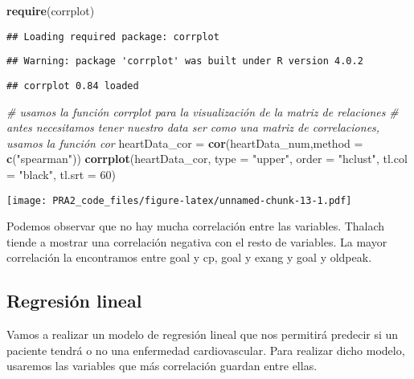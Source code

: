 \documentclass[
]{article}
\newenvironment{Shaded}{\begin{snugshade}}{\end{snugshade}}
\newcommand{\CommentTok}[1]{\textcolor[rgb]{0.56,0.35,0.01}{\textit{#1}}}
\newcommand{\DataTypeTok}[1]{\textcolor[rgb]{0.13,0.29,0.53}{#1}}
\newcommand{\DecValTok}[1]{\textcolor[rgb]{0.00,0.00,0.81}{#1}}
\newcommand{\KeywordTok}[1]{\textcolor[rgb]{0.13,0.29,0.53}{\textbf{#1}}}
\newcommand{\NormalTok}[1]{#1}
\newcommand{\StringTok}[1]{\textcolor[rgb]{0.31,0.60,0.02}{#1}}
\begin{document}
\begin{Shaded}
\begin{Highlighting}[]
\KeywordTok{require}\NormalTok{(corrplot)}
\end{Highlighting}
\end{Shaded}

\begin{verbatim}
## Loading required package: corrplot
\end{verbatim}

\begin{verbatim}
## Warning: package 'corrplot' was built under R version 4.0.2
\end{verbatim}

\begin{verbatim}
## corrplot 0.84 loaded
\end{verbatim}

\begin{Shaded}
\begin{Highlighting}[]
\CommentTok{# usamos la función corrplot para la visualización de la matriz de relaciones}
\CommentTok{# antes necesitamos tener nuestro data ser como una matriz de correlaciones, usamos la función cor}
\NormalTok{heartData_cor =}\StringTok{ }\KeywordTok{cor}\NormalTok{(heartData_num,}\DataTypeTok{method =} \KeywordTok{c}\NormalTok{(}\StringTok{"spearman"}\NormalTok{))}
\KeywordTok{corrplot}\NormalTok{(heartData_cor, }\DataTypeTok{type =} \StringTok{"upper"}\NormalTok{, }\DataTypeTok{order =} \StringTok{"hclust"}\NormalTok{, }\DataTypeTok{tl.col =} \StringTok{"black"}\NormalTok{, }\DataTypeTok{tl.srt =} \DecValTok{60}\NormalTok{)}
\end{Highlighting}
\end{Shaded}

\texttt{[image: PRA2\_code\_files/figure-latex/unnamed-chunk-13-1.pdf]}

Podemos observar que no hay mucha correlación entre las variables.
Thalach tiende a mostrar una correlación negativa con el resto de
variables. La mayor correlación la encontramos entre goal y cp, goal y
exang y goal y oldpeak.

\hypertarget{regresiuxf3n-lineal}{%
\subsection{Regresión lineal}\label{regresiuxf3n-lineal}}

Vamos a realizar un modelo de regresión lineal que nos permitirá
predecir si un paciente tendrá o no una enfermedad cardiovascular. Para
realizar dicho modelo, usaremos las variables que más correlación
guardan entre ellas.
\end{document}
